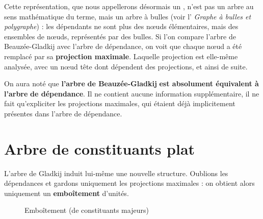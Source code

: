 Cette représentation, que nous appellerons désormais un , n’est pas un arbre au sens mathématique du terme, mais un arbre à bulles (voir l’ \textit{Graphe à bulles et polygraphe}) : les dépendants ne sont plus des nœuds élémentaires, mais des ensembles de nœuds, représentés par des bulles. Si l’on compare l’arbre de Beauzée-Gladkij avec l’arbre de dépendance, on voit que chaque nœud a été remplacé par sa \textbf{projection maximale}. Laquelle projection est elle-même analysée, avec un nœud tête dont dépendent des projections, et ainsi de suite.

On aura noté que \textbf{l’arbre} \textbf{de Beauzée-Gladkij} \textbf{est absolument équivalent à l’arbre} \textbf{de dépendance}. Il ne contient aucune information supplémentaire, il ne fait qu’expliciter les projections maximales, qui étaient déjà implicitement présentes dans l’arbre de dépendance.

\section{Arbre de constituants plat}\label{sec:3.4.2}

L’arbre de Gladkij induit lui-même une nouvelle structure. Oublions les dépendances et gardons uniquement les projections maximales : on obtient alors uniquement un \textbf{emboîtement} d’unités. 

\begin{figure}

\caption{\label{fig:laponie-box}Emboîtement (de constituants majeurs)}

\end{figure}

